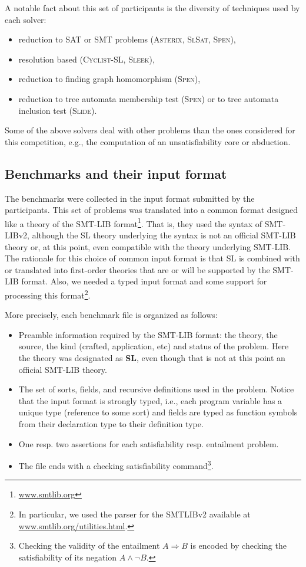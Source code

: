 \documentclass[twoside,11pt]{article}
\newcommand{\limp}{\Rightarrow}
\newcommand{\ASTERIX}{\textsc{Asterix}}
\newcommand{\CYCLIST}{\textsc{Cyclist-SL}}
\newcommand{\SLEEK}{\textsc{Sleek}}
\newcommand{\SLIDE}{\textsc{Slide}}
\newcommand{\SLSAT}{\textsc{SlSat}}
\newcommand{\SPEN}{\textsc{Spen}}
\begin{document}
A notable fact about this set of participants is the diversity of techniques used by each solver:
\begin{itemize}
\item reduction to SAT or SMT problems (\ASTERIX, \SLSAT, \SPEN),
\item resolution based (\CYCLIST, \SLEEK),
\item reduction to finding graph homomorphism (\SPEN),
\item reduction to tree automata membership test (\SPEN) or to tree automata inclusion test (\SLIDE).
\end{itemize}

Some of the above solvers deal with other problems than the ones considered for this competition, e.g., the computation of an unsatisfiability core or abduction.


\subsection{Benchmarks and their input format}
The benchmarks were collected in the input format submitted by the participants.
This set of problems was translated into a common format designed like a theory of the SMT-LIB format\footnote{\url{www.smtlib.org}}. That is, they used the syntax of SMT-LIBv2, although the SL theory underlying the syntax is not an official SMT-LIB theory or, at this point, even compatible with the theory underlying SMT-LIB.
The rationale for this choice of common input format is 
that SL is combined with or translated into first-order theories that are or will be supported by the SMT-LIB format.
Also, we needed a typed input format and some support for processing this format\footnote{In particular, we used the parser for the SMTLIBv2 available at \url{www.smtlib.org/utilities.html}.}.
 
More precisely, each benchmark file is organized as follows:
\begin{itemize}
\item Preamble information required by the SMT-LIB format: the theory, the source, the kind (crafted, application, etc) and status of the problem.  Here the theory was designated as \textbf{SL}, even though that is not at this point an official SMT-LIB theory. %
\item The set of sorts, fields, and recursive definitions used in the problem. Notice that the input format is strongly typed, i.e., each program variable has a unique type (reference to some sort) and 
fields are typed as function symbols from their declaration type to their definition type. 
\item One resp. two assertions for each satisfiability resp. entailment problem. 
\item The file ends with a checking satisfiability command\footnote{Checking the validity of the entailment $A\limp B$ is encoded by checking the satisfiability of its negation $A \land \lnot B$.}.
\end{itemize}
\end{document}
